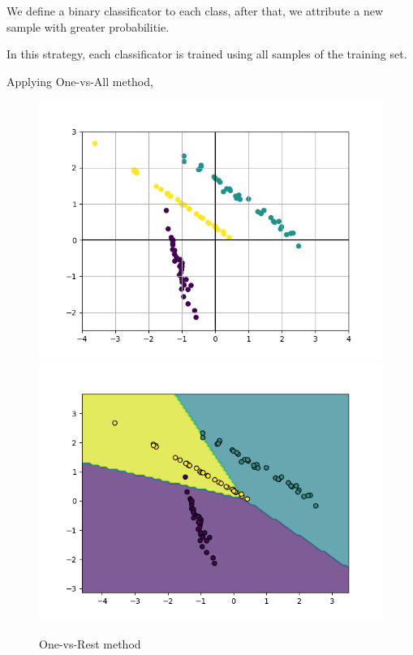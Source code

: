\documentclass[a4paper, 11pt]{article}
\begin{document}
We define a binary classificator to each class, after that, we attribute a new sample with greater probabilitie.

In this strategy, each classificator is trained using all samples of the training set.

Applying One-vs-All method, 
\begin{figure}[H]
        \centering
        \includegraphics[scale=0.5]{test.png}
        \includegraphics[scale=0.5]{OnevsAll.png}

        \caption{One-vs-Rest method}
\end{figure}
\end{document}
